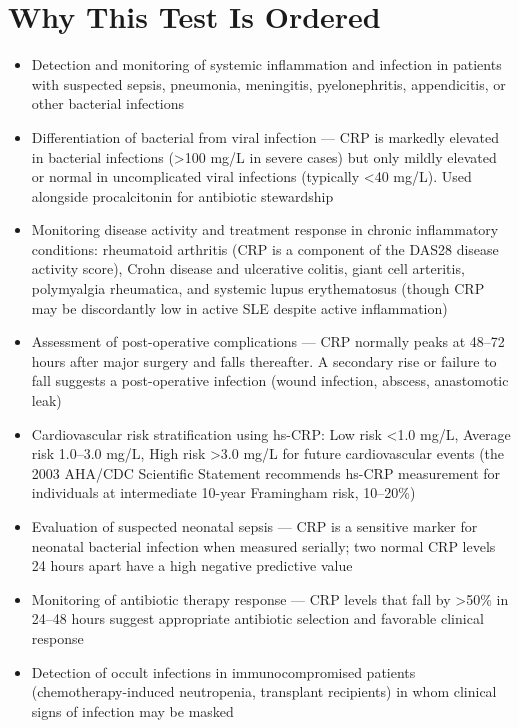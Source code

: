 \section*{Why This Test Is Ordered}
\begin{itemize}
  \item Detection and monitoring of systemic inflammation and infection in patients with suspected sepsis, pneumonia, meningitis, pyelonephritis, appendicitis, or other bacterial infections
  \item Differentiation of bacterial from viral infection --- CRP is markedly elevated in bacterial infections (>100 mg/L in severe cases) but only mildly elevated or normal in uncomplicated viral infections (typically <40 mg/L). Used alongside procalcitonin for antibiotic stewardship
  \item Monitoring disease activity and treatment response in chronic inflammatory conditions: rheumatoid arthritis (CRP is a component of the DAS28 disease activity score), Crohn disease and ulcerative colitis, giant cell arteritis, polymyalgia rheumatica, and systemic lupus erythematosus (though CRP may be discordantly low in active SLE despite active inflammation)
  \item Assessment of post-operative complications --- CRP normally peaks at 48--72 hours after major surgery and falls thereafter. A secondary rise or failure to fall suggests a post-operative infection (wound infection, abscess, anastomotic leak)
  \item Cardiovascular risk stratification using hs-CRP: Low risk <1.0 mg/L, Average risk 1.0--3.0 mg/L, High risk >3.0 mg/L for future cardiovascular events (the 2003 AHA/CDC Scientific Statement recommends hs-CRP measurement for individuals at intermediate 10-year Framingham risk, 10--20\%)
  \item Evaluation of suspected neonatal sepsis --- CRP is a sensitive marker for neonatal bacterial infection when measured serially; two normal CRP levels 24 hours apart have a high negative predictive value
  \item Monitoring of antibiotic therapy response --- CRP levels that fall by >50\% in 24--48 hours suggest appropriate antibiotic selection and favorable clinical response
  \item Detection of occult infections in immunocompromised patients (chemotherapy-induced neutropenia, transplant recipients) in whom clinical signs of infection may be masked
\end{itemize}

